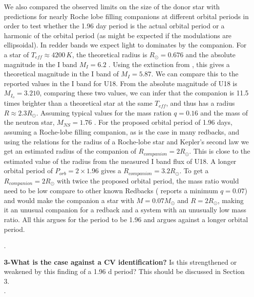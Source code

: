 \documentclass{article}
\begin{document}
\begin{displayquote}
 
 We also compared the observed limits on the size of the donor star with predictions for nearly Roche lobe filling companions at different orbital periods in order to test whether the 1.96 day period is the actual orbital period or a harmonic of the orbital period (as might be expected if the modulations are ellipsoidal). In redder bands we expect light to dominates by the companion. For a star of $T_{eff} \approx 4200 \, K$, the theoretical radius is $R_\odot = 0.676$ and the absolute magnitude in the I band  $M_{I} = 6.2$ \citep{Mamajek2013}. Using the extinction from \cite{Richer2008}, this gives a theoretical magnitude in the I band of $M_I = 5.87$. We can compare this to the reported values in the I band for U18. From \cite{Pallanca2017Halpha} the absolute magnitude of U18 is  $M_{I_o} = 3.210$, comparing these two values, we can infer that the companion is 11.5 times brighter than a theoretical star at the same $T_{eff}$, and thus has a radius $R \approx 2.3 R_\odot$. Assuming typical values for the mass ration $q=0.16$ and the mass of the neutron star, $M_{NS}=1.76$ \citep{Strader2019Redbacks}. For the proposed orbital period of 1.96 days, assuming a Roche-lobe filling companion, as is the case in many redbacks, and using the \cite{Paczy1971} relations for the radius of a Roche-lobe star and Kepler's second law we get an estimated radius of the companion of $R_{companion} = 2 R_\odot$. This is close to the estimated value of the radius from the measured I band flux of U18. A longer orbital period of $P_{orb}=2\times 1.96$ gives a $R_{companion} = 3.2 R_{\odot}$. To get a $R_{companion} = 2 R_\odot$ with twice the proposed orbital period, the mass ratio would need to be low compare to other known Redbacks (\cite{Strader2019Redbacks} reports a minimum $q= 0.07$) and would make the companion a star with $M =0.07 M_\odot$ and $R= 2 R_\odot$, making it an unusual companion for a redback and a system with an unusually low mass ratio. All this argues for the period to be 1.96 and argues against a longer orbital period. 
 
\end{displayquote}
  \hrulefill. 





\textbf{3-What is the case against a CV identification?} Is this strengthened or
 weakened by this finding of a 1.96 d period? This should be discussed
 in Section 3.\\
 
 \hrulefill. 
\end{document}
